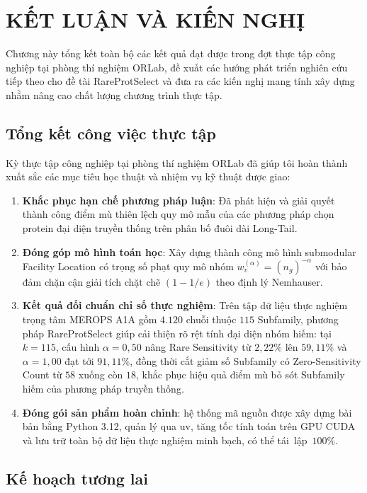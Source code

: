 \chapter{KẾT LUẬN VÀ KIẾN NGHỊ}
\label{chap:ket_luan_kien_nghi}

Chương này tổng kết toàn bộ các kết quả đạt được trong đợt thực tập công nghiệp tại phòng thí nghiệm ORLab, đề xuất các hướng phát triển nghiên cứu tiếp theo cho đề tài RareProtSelect và đưa ra các kiến nghị mang tính xây dựng nhằm nâng cao chất lượng chương trình thực tập.

\section{Tổng kết công việc thực tập}
\label{sec:tong_ket_thuc_tap}

Kỳ thực tập công nghiệp tại phòng thí nghiệm ORLab đã giúp tôi hoàn thành xuất sắc các mục tiêu học thuật và nhiệm vụ kỹ thuật được giao:
\begin{enumerate}
    \item \textbf{Khắc phục hạn chế phương pháp luận}: Đã phát hiện và giải quyết thành công điểm mù thiên lệch quy mô mẫu của các phương pháp chọn protein đại diện truyền thống trên phân bố đuôi dài Long-Tail.
    \item \textbf{Đóng góp mô hình toán học}: Xây dựng thành công mô hình submodular Facility Location có trọng số phạt quy mô nhóm $w_v^{(\alpha)} = (n_g)^{-\alpha}$ với bảo đảm chặn cận giải tích chặt chẽ $(1 - 1/e)$ theo định lý Nemhauser.
    \item \textbf{Kết quả đối chuẩn chỉ số thực nghiệm}: Trên tập dữ liệu thực nghiệm trọng tâm MEROPS A1A gồm $4.120$ chuỗi thuộc $115$ Subfamily, phương pháp RareProtSelect giúp cải thiện rõ rệt tính đại diện nhóm hiếm: tại $k = 115$, cấu hình $\alpha = 0{,}50$ nâng Rare Sensitivity từ $2{,}22\%$ lên $59{,}11\%$ và $\alpha = 1{,}00$ đạt tới $91{,}11\%$, đồng thời cắt giảm số Subfamily có Zero-Sensitivity Count từ $58$ xuống còn $18$, khắc phục hiệu quả điểm mù bỏ sót Subfamily hiếm của phương pháp truyền thống.
    \item \textbf{Đóng gói sản phẩm hoàn chỉnh}: hệ thống mã nguồn được xây dựng bài bản bằng Python 3.12, quản lý qua uv, tăng tốc tính toán trên GPU CUDA và lưu trữ toàn bộ dữ liệu thực nghiệm minh bạch, có thể tái~lập~$100\%$.
\end{enumerate}

\section{Kế hoạch tương lai}
\label{sec:ke_hoach_tuong_lai}

